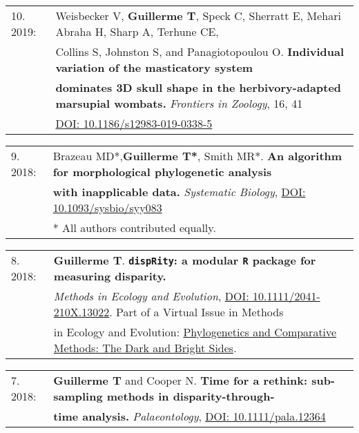 \documentclass[10pt,a4paper]{article}
\begin{document}
{\begin{tabular}{ll}
10. 2019: & Weisbecker V, \textbf{Guillerme T}, Speck C, Sherratt E, Mehari Abraha H, Sharp A, Terhune CE, \\
      & Collins S, Johnston S, and Panagiotopoulou O. \textbf{Individual variation of the masticatory system} \\
      & \textbf{dominates 3D skull shape in the herbivory-adapted marsupial wombats.} \textit{Frontiers in Zoology}, 16, 41\\
      & \href{https://frontiersinzoology.biomedcentral.com/articles/10.1186/s12983-019-0338-5}{DOI: 10.1186/s12983-019-0338-5}\\
\end{tabular}
\bigskip

\begin{tabular}{ll}
9. 2018: & Brazeau MD*,\textbf{Guillerme T*}, Smith MR*. \textbf{An algorithm for morphological phylogenetic analysis} \\
      & \textbf{with inapplicable data.} \textit{Systematic Biology}, \href{https://doi.org/10.1093/sysbio/syy083}{DOI: 10.1093/sysbio/syy083}\\
      & \footnotesize{* All authors contributed equally.}
\end{tabular}

\bigskip

\begin{tabular}{ll}
8. 2018: & \textbf{Guillerme T}. \textbf{\texttt{dispRity}: a modular \texttt{R} package for measuring disparity.}\\
      & \textit{Methods in Ecology and Evolution}, \href{https://besjournals.onlinelibrary.wiley.com/doi/abs/10.1111/2041-210X.13022}{DOI: 10.1111/2041-210X.13022}. Part of a Virtual Issue in Methods\\
      & in Ecology and Evolution: \href{https://besjournals.onlinelibrary.wiley.com/doi/toc/10.1111/(ISSN)2041-210X.PhylogeneticsMEE2019}{Phylogenetics and Comparative Methods: The Dark and Bright Sides}.\\

\end{tabular}

\bigskip

\begin{tabular}{ll}
7. 2018: & \textbf{Guillerme T} and Cooper N. \textbf{Time for a rethink: sub-sampling methods in disparity-through-}\\
      & \textbf{time analysis.} \textit{Palaeontology}, \href{https://onlinelibrary.wiley.com/doi/abs/10.1111/pala.12364}{DOI: 10.1111/pala.12364}\\
\end{tabular}

}
\end{document}
